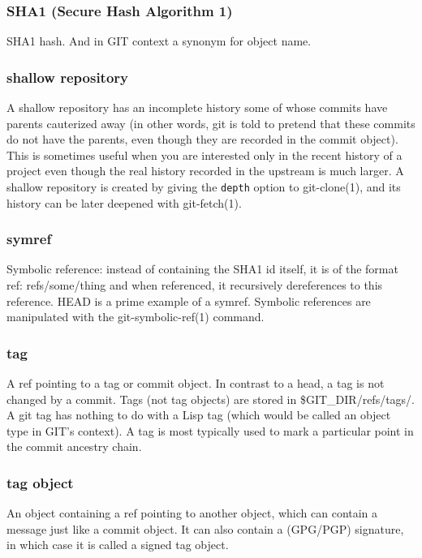\subsubsection{SHA1 (Secure Hash Algorithm 1)}

SHA1 hash. And in GIT context a synonym for object name.

\subsubsection{shallow repository}

A shallow repository has an incomplete history some of whose commits have parents cauterized away (in other words, git is told to pretend that these commits do not have the parents, even though they are recorded in the commit object). This is sometimes useful when you are interested only in the recent history of a project even though the real history recorded in the upstream is much larger. A shallow repository is created by giving the \texttt{depth} option to git-clone(1), and its history can be later deepened with git-fetch(1).

\subsubsection{symref}

Symbolic reference: instead of containing the SHA1 id itself, it is of the format ref: refs/some/thing and when referenced, it recursively dereferences to this reference. HEAD is a prime example of a symref. Symbolic references are manipulated with the git-symbolic-ref(1) command.

\subsubsection{tag}

A ref pointing to a tag or commit object. In contrast to a head, a tag is not changed by a commit. Tags (not tag objects) are stored in \$GIT\_DIR/refs/tags/. A git tag has nothing to do with a Lisp tag (which would be called an object type in GIT's context). A tag is most typically used to mark a particular point in the commit ancestry chain.

\subsubsection{tag object}

An object containing a ref pointing to another object, which can contain a message just like a commit object. It can also contain a (GPG/PGP) signature, in which case it is called a signed tag object.

